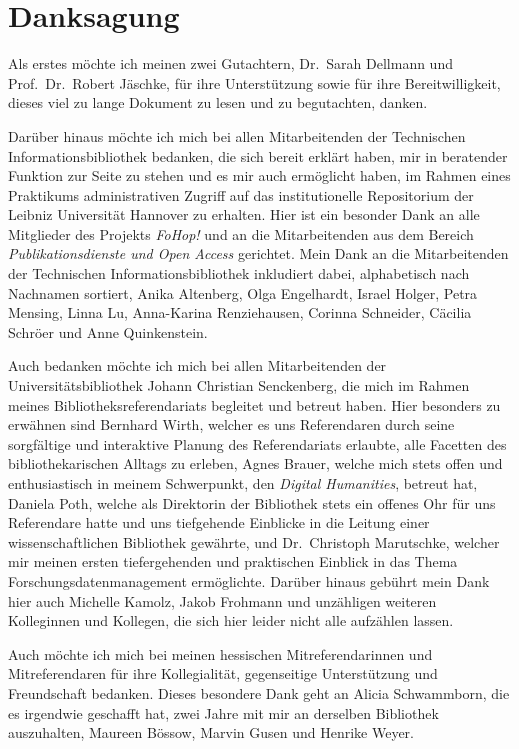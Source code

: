 \chapter{Danksagung}
Als erstes möchte ich meinen zwei Gutachtern, Dr.~Sarah Dellmann und Prof.~Dr.~Robert Jäschke, für ihre Unterstützung sowie für ihre Bereitwilligkeit, dieses viel zu lange Dokument zu lesen und zu begutachten, danken.

Darüber hinaus möchte ich mich bei allen Mitarbeitenden der Technischen Informationsbibliothek bedanken, die sich bereit erklärt haben, mir in beratender Funktion zur Seite zu stehen und es mir auch ermöglicht haben, im Rahmen eines Praktikums administrativen Zugriff auf das institutionelle Repositorium der Leibniz Universität Hannover zu erhalten.
Hier ist ein besonder Dank an alle Mitglieder des Projekts \textit{FoHop!} und an die Mitarbeitenden aus dem Bereich \textit{Publikationsdienste und Open Access} gerichtet.
Mein Dank an die Mitarbeitenden der Technischen Informationsbibliothek inkludiert dabei, alphabetisch nach Nachnamen sortiert, Anika Altenberg, Olga Engelhardt, Israel Holger, Petra Mensing, Linna Lu, Anna-Karina Renziehausen, Corinna Schneider, Cäcilia Schröer und Anne Quinkenstein.

Auch bedanken möchte ich mich bei allen Mitarbeitenden der Universitätsbibliothek Johann Christian Senckenberg, die mich im Rahmen meines Bibliotheksreferendariats begleitet und betreut haben.
Hier besonders zu erwähnen sind Bernhard Wirth, welcher es uns Referendaren durch seine sorgfältige und interaktive Planung des Referendariats erlaubte, alle Facetten des bibliothekarischen Alltags zu erleben, Agnes Brauer, welche mich stets offen und enthusiastisch in meinem Schwerpunkt, den \textit{Digital Humanities}, betreut hat, Daniela Poth, welche als Direktorin der Bibliothek stets ein offenes Ohr für uns Referendare hatte und uns tiefgehende Einblicke in die Leitung einer wissenschaftlichen Bibliothek gewährte, und Dr.~Christoph Marutschke, welcher mir meinen ersten tiefergehenden und praktischen Einblick in das Thema Forschungsdatenmanagement ermöglichte.
Darüber hinaus gebührt mein Dank hier auch Michelle Kamolz, Jakob Frohmann und unzähligen weiteren Kolleginnen und Kollegen, die sich hier leider nicht alle aufzählen lassen.

Auch möchte ich mich bei meinen hessischen Mitreferendarinnen und Mitreferendaren für ihre Kollegialität, gegenseitige Unterstützung und Freundschaft bedanken.
Dieses besondere Dank geht an Alicia Schwammborn, die es irgendwie geschafft hat, zwei Jahre mit mir an derselben Bibliothek auszuhalten, Maureen Bössow, Marvin Gusen und Henrike Weyer.


